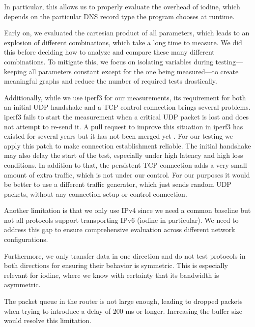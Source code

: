 In particular, this allows us to properly evaluate the overhead of iodine, which depends on the particular DNS record type the program chooses at runtime.

Early on, we evaluated the cartesian product of all parameters, which leads to an explosion of different combinations, which take a long time to measure.
We did this before deciding how to analyze and compare these many different combinations.
To mitigate this, we focus on isolating variables during testing—keeping all parameters constant except for the one being measured—to create meaningful graphs and reduce the number of required tests drastically.

Additionally, while we use iperf3 for our measurements, its requirement for both an initial UDP handshake and a TCP control connection brings several problems.
iperf3 fails to start the measurement when a critical UDP packet is lost and does not attempt to re-send it.
A pull request to improve this situation in iperf3 has existed for several years but it has not been merged yet \cite{iperf-udp-connect-retry}.
For our testing we apply this patch to make connection establishment reliable.
The initial handshake may also delay the start of the test, especially under high latency and high loss conditions.
In addition to that, the persistent TCP connection adds a very small amount of extra traffic, which is not under our control.
For our purposes it would be better to use a different traffic generator, which just sends random UDP packets, without any connection setup or control connection.

Another limitation is that we only use IPv4 since we need a common baseline but not all protocols support transporting IPv6 (iodine in particular).
We need to address this gap to ensure comprehensive evaluation across different network configurations.

Furthermore, we only transfer data in one direction and do not test protocols in both directions for ensuring their behavior is symmetric.
This is especially relevant for iodine, where we know with certainty that its bandwidth is asymmetric.

The packet queue in the router is not large enough, leading to dropped packets when trying to introduce a delay of 200 ms or longer.
Increasing the buffer size would resolve this limitation.

